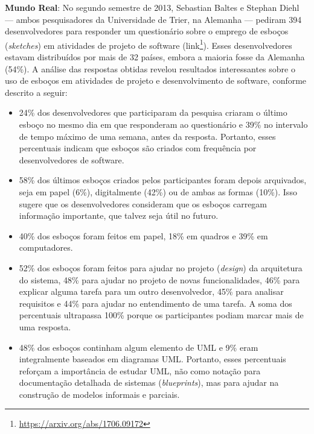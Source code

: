 \documentclass[
  11pt,
  twoside]{book}
\DeclareRobustCommand{\href}[2]{#2\footnote{\url{#1}}}
\newenvironment{esmbox}{\centering \vspace{1.5ex} \begin{tcolorbox}[breakable, colback=backcolor, width=4.9in]}{\end{tcolorbox} \vspace{1.5ex}}
\begin{document}
\begin{esmbox}

\textbf{Mundo Real}: No segundo semestre de 2013, Sebastian Baltes e
Stephan Diehl --- ambos pesquisadores da Universidade de Trier, na
Alemanha --- pediram 394 desenvolvedores para responder um questionário
sobre o emprego de esboços (\emph{sketches}) em atividades de projeto de
software (\href{https://arxiv.org/abs/1706.09172}{link}). Esses
desenvolvedores estavam distribuídos por mais de 32 países, embora a
maioria fosse da Alemanha (54\%). A análise das respostas obtidas
revelou resultados interessantes sobre o uso de esboços em atividades de
projeto e desenvolvimento de software, conforme descrito a seguir:

\begin{itemize}
\item
  24\% dos desenvolvedores que participaram da pesquisa criaram o último
  esboço no mesmo dia em que responderam ao questionário e 39\% no
  intervalo de tempo máximo de uma semana, antes da resposta. Portanto,
  esses percentuais indicam que esboços são criados com frequência por
  desenvolvedores de software.
\item
  58\% dos últimos esboços criados pelos participantes foram depois
  arquivados, seja em papel (6\%), digitalmente (42\%) ou de ambas as
  formas (10\%). Isso sugere que os desenvolvedores consideram que os
  esboços carregam informação importante, que talvez seja útil no
  futuro.
\item
  40\% dos esboços foram feitos em papel, 18\% em quadros e 39\% em
  computadores.
\item
  52\% dos esboços foram feitos para ajudar no projeto (\emph{design})
  da arquitetura do sistema, 48\% para ajudar no projeto de novas
  funcionalidades, 46\% para explicar alguma tarefa para um outro
  desenvolvedor, 45\% para analisar requisitos e 44\% para ajudar no
  entendimento de uma tarefa. A soma dos percentuais ultrapassa 100\%
  porque os participantes podiam marcar mais de uma resposta.
\item
  48\% dos esboços continham algum elemento de UML e 9\% eram
  integralmente baseados em diagramas UML. Portanto, esses percentuais
  reforçam a importância de estudar UML, não como notação para
  documentação detalhada de sistemas (\emph{blueprints}), mas para
  ajudar na construção de modelos informais e parciais.
\end{itemize}

\end{esmbox}
\end{document}
